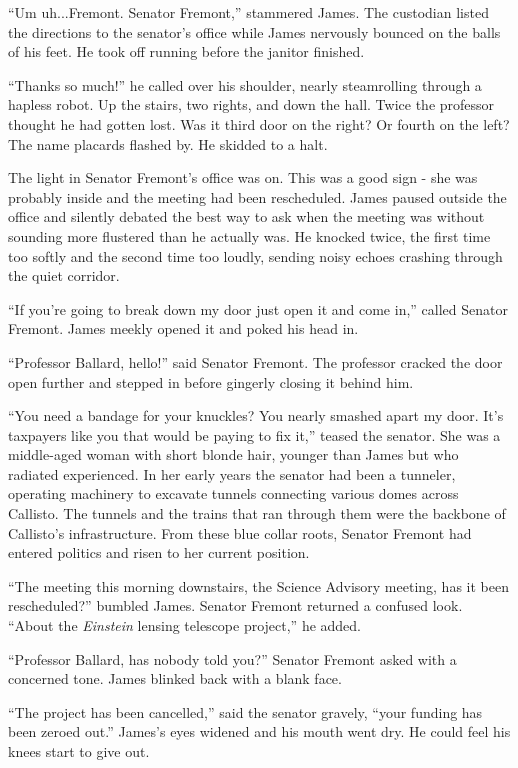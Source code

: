 \documentclass[openany, 12pt]{book} %
\begin{document}
``Um uh...Fremont. Senator Fremont,'' stammered James. The custodian listed the directions to the senator's office while James nervously bounced on the balls of his feet. He took off running before the janitor finished.

``Thanks so much!'' he called over his shoulder, nearly steamrolling through a hapless robot. Up the stairs, two rights, and down the hall. Twice the professor thought he had gotten lost. Was it third door on the right? Or fourth on the left? The name placards flashed by. He skidded to a halt.

The light in Senator Fremont's office was on. This was a good sign - she was probably inside and the meeting had been rescheduled. James paused outside the office and silently debated the best way to ask when the meeting was without sounding more flustered than he actually was. He knocked twice, the first time too softly and the second time too loudly, sending noisy echoes crashing through the quiet corridor.

``If you're going to break down my door just open it and come in,'' called Senator Fremont. James meekly opened it and poked his head in.

``Professor Ballard, hello!'' said Senator Fremont. The professor cracked the door open further and stepped in before gingerly closing it behind him.

``You need a bandage for your knuckles? You nearly smashed apart my door. It's taxpayers like you that would be paying to fix it,'' teased the senator. She was a middle-aged woman with short blonde hair, younger than James but who radiated experienced. In her early years the senator had been a tunneler, operating machinery to excavate tunnels connecting various domes across Callisto. The tunnels and the trains that ran through them were the backbone of Callisto's infrastructure. From these blue collar roots, Senator Fremont had entered politics and risen to her current position.

``The meeting this morning downstairs, the Science Advisory meeting, has it been rescheduled?'' bumbled James. Senator Fremont returned a confused look. ``About the \textit{Einstein} lensing telescope project,'' he added.

``Professor Ballard, has nobody told you?'' Senator Fremont asked with a concerned tone. James blinked back with a blank face.

``The project has been cancelled,'' said the senator gravely, ``your funding has been zeroed out.''
James's eyes widened and his mouth went dry. He could feel his knees start to give out.
\end{document}
